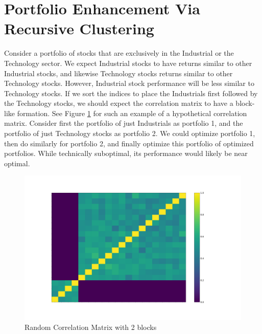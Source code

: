 \documentclass[10pt,twoside,titlepage]{article}   %
\begin{document}
\section{Portfolio Enhancement Via Recursive Clustering}\label{sec-RCRP}
Consider a portfolio of stocks that are exclusively in the Industrial or the Technology sector. 
We expect Industrial stocks to have returns similar to other Industrial stocks, and likewise Technology stocks returns similar to other Technology stocks. 
However, Industrial stock performance will be less similar to Technology stocks. 
If we sort the indices to place the Industrials first followed by the Technology stocks, 
we should expect the correlation matrix to have a block-like formation. 
See Figure \ref{figRandomCorr} for such an example of a hypothetical correlation matrix. 
Consider first the portfolio of just Industrials as portfolio 1, 
and the portfolio of just Technology stocks as portfolio 2. 
We could optimize portfolio 1, then do similarly for portfolio 2, 
and finally optimize this portfolio of optimized portfolios. 
While technically suboptimal, its performance would likely be near optimal. 

\noindent
\begin{figure}[h]
\includegraphics[width = 1.00\textwidth]{BlockCorr.png}
\vspace{-1.75\baselineskip}
\caption{Random Correlation Matrix with 2 blocks}
\label{figRandomCorr}
\end{figure}
\end{document}
